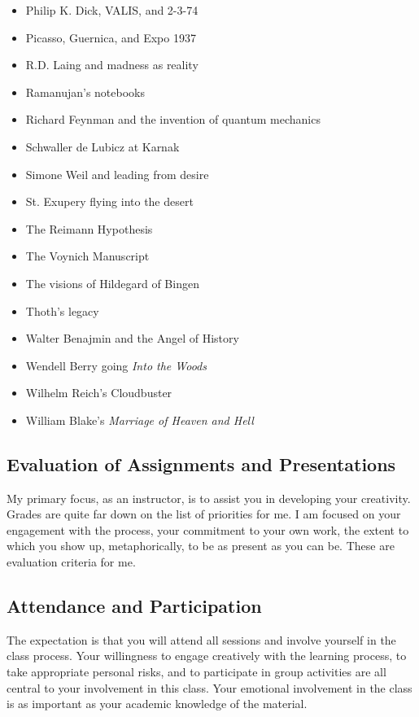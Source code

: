 \documentclass{report}
\begin{document}
\begin{itemize}
\item Philip K. Dick, VALIS, and 2-3-74
\item Picasso, Guernica, and Expo 1937
\item R.D. Laing and madness as reality
\item Ramanujan's notebooks
\item Richard Feynman and the invention of quantum mechanics
\item Schwaller de Lubicz at Karnak
\item Simone Weil and leading from desire
\item St. Exupery flying into the desert
\item The Reimann Hypothesis
\item The Voynich Manuscript
\item The visions of Hildegard of Bingen
\item Thoth's legacy
\item Walter Benajmin and the Angel of History
\item Wendell Berry going \textit{Into the Woods}
\item Wilhelm Reich's Cloudbuster
\item William Blake's \textit{Marriage of Heaven and Hell}

\end{itemize}


\subsection{Evaluation of Assignments and Presentations}
My primary focus, as an instructor, is to assist you in developing
your creativity. Grades are quite far down on the list of priorities
for me. I am focused on your engagement with the process, your
commitment to your own work, the extent to which you show up,
metaphorically, to be as present as you can be. These are evaluation
criteria for me.

\subsection{Attendance and Participation}
The expectation is that you will attend all sessions and involve
yourself in the class process. Your willingness to engage creatively
with the learning process, to take appropriate personal risks, and to
participate in group activities are all central to your involvement in
this class. Your emotional involvement in the class is
as important as your academic knowledge of the material.
\end{document}
